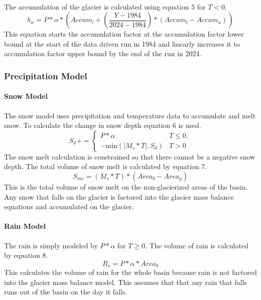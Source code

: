 \documentclass{article}
\begin{document}
\paragraph{}
The accumulation of the glacier is calculated using equation 5 for $T<0$.
\begin{equation}b_w=P*\alpha*({Accum}_{l}+\left(\frac{Y-1984}{2024-1984}\right)*({Accum}_{l}-{Accum}_{u}))\label{tab:winter_mb_eq}\end{equation}
This equation starts the accumulation factor at the accumulation factor lower bound at the start of the data driven run in 1984 and linearly 
increases it to accumulation factor upper bound by the end of the run in 2024.

\subsubsection{Precipitation Model}
\paragraph{Snow Model}
The snow model uses precipitation and temperature data to accumulate and melt snow. To calculate the change in snow depth equation 6 is used.
\begin{equation}S_{d} += 
\begin{cases} 
  P*\alpha & T \leq 0,\\
  -\text{min}(|M_{s}*T|,S_{d}) &  T > 0
\end{cases}\label{tab:snow_depth_eq}\end{equation}
The snow melt calculation is constrained so that there cannot be a negative snow depth. 
The total volume of snow melt is calculated by equation 7.
\begin{equation}S_{mv}=(M_{s}*T)*({Area}_{b}-{Area}_{g})\label{tab:snow_melt_eq}\end{equation}
This is the total volume of snow melt on the non-glacierized areas of the basin. Any snow that falls on the glacier is factored into 
the glacier mass balance equations and accumulated on the glacier.
\paragraph{Rain Model}
The rain is simply modeled by $P*\alpha$ for $T\geq0$. The volume of rain is calculated by equation 8.
\begin{equation}R_{v}=P*\alpha*{Area}_{b}\label{tab:rain_vol_eq}\end{equation}
This calculates the volume of rain for the whole basin because rain is not factored into the glacier mass balance model. This assumes that  that any rain 
that falls runs out of the basin on the day it falls.
\end{document}
